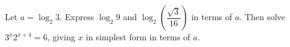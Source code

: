 Let $a=\log_2 3$. Express $\log_2 9$ and $\log_2\left(\dfrac{\sqrt3}{16}\right)$ in terms of $a$. Then solve $3^x2^{x+4}=6$, giving $x$ in simplest form in terms of $a$.
